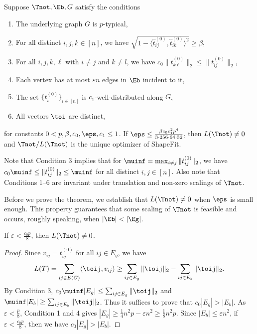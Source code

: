 \begin{theorem} \label{thm:mainthm}
Suppose $\Tnot, \Eb, G$ satisfy the conditions
\begin{enumerate}
  \setlength{\itemsep}{1pt} \setlength{\parskip}{0pt}
  \setlength{\parsep}{0pt}
	\item The underlying graph $G$ is $p$-typical,
	\item For all distinct $i,j,k \in [n]$, we have $\sqrt{1-\langle\hat{t}_{ij}^{(0)},\hat{t}_{ik}^{(0)}\rangle^{2}}\ge\beta$,
	\item For all $i,j,k,\ell$ with $i\neq j$ and $k\neq l$, we have $c_{0}\|t_{k\ell}^{(0)}\|_2\le\|t_{ij}^{(0)}\|_2$,
	\item Each vertex has at most $\varepsilon n$ edges in $\Eb$ incident to it,
	\item The set $\{t_{i}^{(0)}\}_{i \in [n]}$ is $c_{1}$-well-distributed
along $G$,
	\item All vectors $\toi$ are distinct,
\end{enumerate}
for constants $0< p, \beta, c_{0}, \eps, c_{1} \leq 1$.  If $\eps \leq \frac{\beta c_0 c_1^2 p^4}{3\cdot 256 \cdot 64 \cdot 32}$, then $L(\Tnot)\neq 0$ and $\Tnot / L(\Tnot)$ is the unique optimizer of ShapeFit.
\end{theorem}


Note that Condition 3 implies that for $\muinf = \max_{i\neq j}\|t_{ij}^{(0)}\|_2$, we have $c_{0}\muinf\le\|t_{ij}^{(0)}\|_2\le\muinf$ for all distinct $i,j \in [n]$. Also note that Conditions 1--6 are invariant under translation and non-zero scalings of $\Tnot$.

Before we prove the theorem, we establish that $L(\Tnot)\neq 0$ when $\eps$ is small enough.  This property guarantees that some scaling of $\Tnot$ is feasible and occurs, roughly speaking, when $|\Eb| < |\Eg|$.


\begin{lemma} \label{lem:T0-feasible} 
If $\varepsilon < \frac{c_0 p}{8}$, then $L(\Tnot) \neq 0$.
\end{lemma}
\begin{proof}
Since $v_{ij} = t_{ij}^{(0)}$ for all $ij \in E_g$, we have
\[
L(T) = \sum_{ij \in E(G)} \langle \toij, v_{ij} \rangle \geq \sum_{ij \in E_g} \| \toij\|_2 - \sum_{ij \in E_b} \| \toij \|_2.
\]
By Condition 3,  $c_0 \muinf |E_g| \leq \sum_{ij \in E_g} \| \toij\|_2$ and $\muinf |E_b| \geq  \sum_{ij\in E_b} \| \toij\|_2$.  Thus it suffices to prove that $c_0 |E_g| > |E_b|$. 
As $\varepsilon < \frac{p}{8}$, Condition 1 and 4 gives $|E_g| \geq \frac{1}{4}n^2 p - \varepsilon n^2 \geq \frac{1}{8}n^2 p$. Since $|E_b| \leq \varepsilon n^2$, if $\varepsilon < \frac{c_0 p}{8}$, then we have $c_0 |E_g| > |E_b|$. 
\end{proof}

